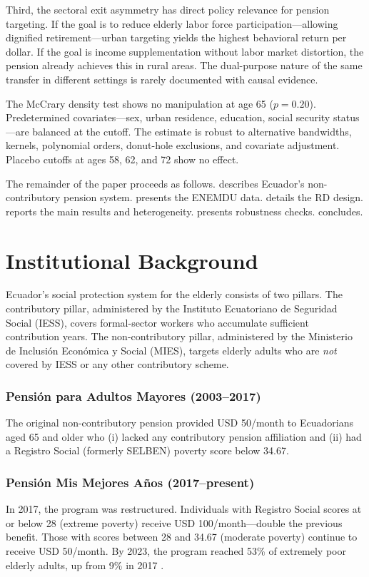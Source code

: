 \documentclass[12pt]{article}
\begin{document}
Third, the sectoral exit asymmetry has direct policy relevance for pension targeting. If the goal is to reduce elderly labor force participation---allowing dignified retirement---urban targeting yields the highest behavioral return per dollar. If the goal is income supplementation without labor market distortion, the pension already achieves this in rural areas. The dual-purpose nature of the same transfer in different settings is rarely documented with causal evidence.

The McCrary density test shows no manipulation at age 65 ($p = 0.20$). Predetermined covariates---sex, urban residence, education, social security status---are balanced at the cutoff. The estimate is robust to alternative bandwidths, kernels, polynomial orders, donut-hole exclusions, and covariate adjustment. Placebo cutoffs at ages 58, 62, and 72 show no effect.

The remainder of the paper proceeds as follows.  describes Ecuador's non-contributory pension system.  presents the ENEMDU data.  details the RD design.  reports the main results and heterogeneity.  presents robustness checks.  concludes.


\section{Institutional Background}
\label{sec:background}

Ecuador's social protection system for the elderly consists of two pillars. The contributory pillar, administered by the Instituto Ecuatoriano de Seguridad Social (IESS), covers formal-sector workers who accumulate sufficient contribution years. The non-contributory pillar, administered by the Ministerio de Inclusi\'{o}n Econ\'{o}mica y Social (MIES), targets elderly adults who are \textit{not} covered by IESS or any other contributory scheme.

\subsubsection*{Pensi\'{o}n para Adultos Mayores (2003--2017)} The original non-contributory pension provided USD 50/month to Ecuadorians aged 65 and older who (i) lacked any contributory pension affiliation and (ii) had a Registro Social (formerly SELBEN) poverty score below 34.67.

\subsubsection*{Pensi\'{o}n Mis Mejores A\~{n}os (2017--present)} In 2017, the program was restructured. Individuals with Registro Social scores at or below 28 (extreme poverty) receive USD 100/month---double the previous benefit. Those with scores between 28 and 34.67 (moderate poverty) continue to receive USD 50/month. By 2023, the program reached 53\% of extremely poor elderly adults, up from 9\% in 2017 \citep{mies2023}.
\end{document}
